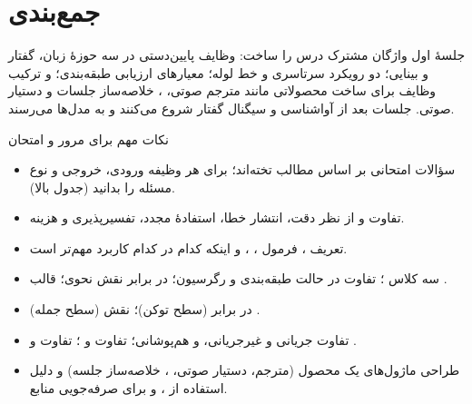 \section{جمع‌بندی}
جلسهٔ اول واژگان مشترک درس را ساخت: وظایف پایین‌دستی در سه حوزهٔ زبان، گفتار و بینایی؛ دو رویکرد سرتاسری و خط لوله؛ معیارهای ارزیابی طبقه‌بندی؛ و ترکیب وظایف برای ساخت محصولاتی مانند مترجم صوتی، ، خلاصه‌ساز جلسات و دستیار صوتی. جلسات بعد از آواشناسی و سیگنال گفتار شروع می‌کنند و به مدل‌ها می‌رسند.

\begin{exambox}{نکات مهم برای مرور و امتحان}
\begin{itemize}
  \item سؤالات امتحانی بر اساس مطالب تخته‌اند؛ برای هر وظیفه ورودی، خروجی و نوع مسئله را بدانید (جدول بالا).
  \item تفاوت  و  از نظر دقت، انتشار خطا، استفادهٔ مجدد، تفسیرپذیری و هزینه.
  \item تعریف ، فرمول ، ،  و اینکه کدام در کدام کاربرد مهم‌تر است.
  \item سه کلاس ؛ تفاوت  در حالت طبقه‌بندی و رگرسیون؛  در برابر نقش نحوی؛ قالب .
  \item {} (سطح جمله) در برابر  (سطح توکن)؛ نقش .
  \item تفاوت جریانی و غیرجریانی،  و هم‌پوشانی؛ تفاوت  و ؛ تفاوت  و .
  \item طراحی ماژول‌های یک محصول (مترجم، دستیار صوتی، ، خلاصه‌ساز جلسه) و دلیل استفاده از ،  و  برای صرفه‌جویی منابع.
\end{itemize}
\end{exambox}
